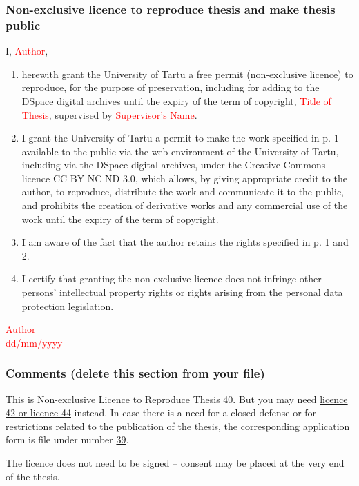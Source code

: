 \subsubsection*{Non-exclusive licence to reproduce thesis and make thesis public}

I, \textcolor{red}{Author},

\begin{enumerate}
\item herewith grant the University of Tartu a free permit (non-exclusive licence) to
reproduce, for the purpose of preservation, including for adding to the DSpace digital archives until the expiry of the term of copyright, \textcolor{red}{Title of Thesis},
supervised by  \textcolor{red}{Supervisor’s Name}.

\item  I grant the University of Tartu a permit to make the work specified in p. 1 available to the public via the web environment of the University of Tartu, including via the DSpace digital archives, under the Creative Commons licence CC BY NC ND 3.0, which allows, by giving appropriate credit to the author, to reproduce, distribute the work and communicate it to the public, and prohibits the creation of derivative works and any commercial use of the work until the expiry of the term of copyright.

\item I am aware of the fact that the author retains the rights specified in p. 1 and 2.

\item I certify that granting the non-exclusive licence does not infringe other persons’ intellectual property rights or rights arising from the personal data protection legislation. 
\end{enumerate}

\textcolor{red}{Author}\\
\textcolor{red}{dd/mm/yyyy}\\


\subsubsection*{Comments (delete this section from your file)}
This is Non-exclusive Licence to Reproduce Thesis 40. But you may need
\href{http://dok.ut.ee/wd/?page=pub_list_dynobj&desktop=57835&tid=70993&data_only=true&search=Otsi&field_100193_search_type=ANY&field_100193_text_search_value=ppimine}{licence 42 or licence 44} instead. In case there is a need for a closed defense or for restrictions related to the publication of the thesis, the corresponding application form is file under number \href{http://dok.ut.ee/wd/?page=pub_list_dynobj&desktop=57835&tid=70993&data_only=true&search=Otsi&field_100193_search_type=ANY&field_100193_text_search_value=ppimine}{39}.

The licence does not need to be signed – consent may be placed at the very end of the thesis.



